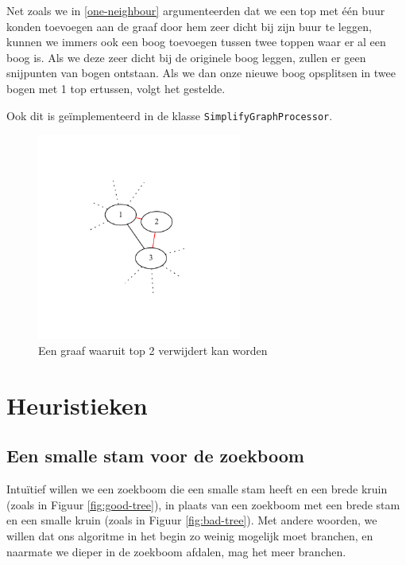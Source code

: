 \documentclass{article}
\begin{document}
Net zoals we in \ref{one-neighbour} argumenteerden dat we een top met \'e\'en
buur konden toevoegen aan de graaf door hem zeer dicht bij zijn buur te leggen,
kunnen we immers ook een boog toevoegen tussen twee toppen waar er al een boog
is. Als we deze zeer dicht bij de originele boog leggen, zullen er geen
snijpunten van bogen ontstaan. Als we dan onze nieuwe boog opsplitsen in twee
bogen met 1 top ertussen, volgt het gestelde.
\newline

Ook dit is ge\"implementeerd in de klasse \verb#SimplifyGraphProcessor#.

\begin{figure}
\begin{center}
\includegraphics[width=0.6\textwidth]{images/two-neighbours-connected.pdf}
\caption{Een graaf waaruit top 2 verwijdert kan worden}
\label{fig:two-neighbours-connected}
\end{center}
\end{figure}

\section{Heuristieken}

\subsection{Een smalle stam voor de zoekboom}
\label{heuristiek-sorteren}
Intu\"itief willen we een zoekboom die een smalle stam heeft en een brede kruin
(zoals in Figuur \ref{fig:good-tree}), in plaats van een zoekboom met een brede
stam en een smalle kruin (zoals in Figuur \ref{fig:bad-tree}). Met andere
woorden, we willen dat ons algoritme in het begin zo weinig mogelijk moet
branchen, en naarmate we dieper in de zoekboom afdalen, mag het meer branchen.
\newline
\end{document}
